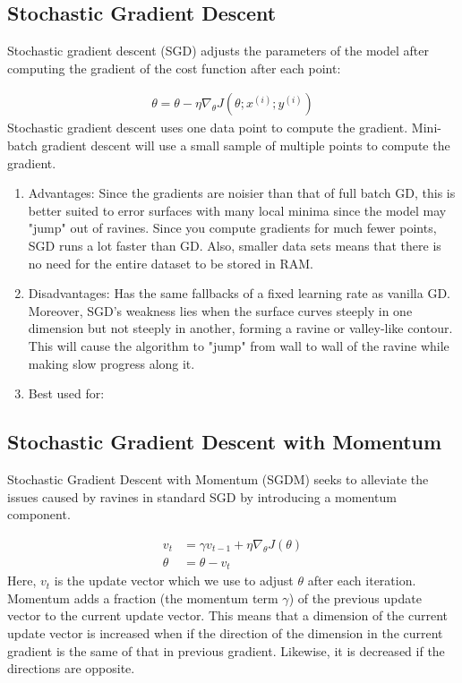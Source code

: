 \documentclass[twoside,11pt]{homework}
\begin{document}
\subsection*{Stochastic Gradient Descent}
Stochastic gradient descent (SGD) adjusts the parameters of the model after computing the gradient of the cost function after each point:

\begin{align*}
	\theta = \theta - \eta \nabla_\theta J(\theta; x^{(i)}; y^{(i)})
\end{align*}
Stochastic gradient descent uses one data point to compute the gradient. Mini-batch gradient descent will use a small sample of multiple points to compute the gradient.
\begin{enumerate}
	\item Advantages: Since the gradients are noisier than that of full batch GD, this is better suited to error surfaces with many local minima since the model may "jump" out of ravines. Since you compute gradients for much fewer points, SGD runs a lot faster than GD. Also, smaller data sets means that there is no need for the entire dataset to be stored in RAM.
	\item Disadvantages: Has the same fallbacks of a fixed learning rate as vanilla GD. Moreover, SGD's weakness lies when the surface curves steeply in one dimension but not steeply in another, forming a ravine or valley-like contour. This will cause the algorithm to "jump" from wall to wall of the ravine while making slow progress along it.
	\item Best used for:
\end{enumerate}

\subsection*{Stochastic Gradient Descent with Momentum}
Stochastic Gradient Descent with Momentum (SGDM) seeks to alleviate the issues caused by ravines in standard SGD by introducing a momentum component. 

\begin{align*}
	v_t &= \gamma v_{t-1} + \eta \nabla_\theta J(\theta)\\
	\theta &= \theta - v_t
\end{align*}
Here, $v_t$ is the update vector which we use to adjust $\theta$ after each iteration. Momentum adds a fraction (the momentum term $\gamma$) of the previous update vector to the current update vector. This means that a dimension of the current update vector is increased when if the direction of the dimension in the current gradient is the same of that in previous gradient. Likewise, it is decreased if the directions are opposite. 
\end{document}
